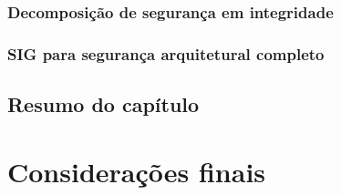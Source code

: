 \subsection{Decomposição de segurança em integridade}

\subsection{SIG para segurança arquitetural completo}

\section{Resumo do capítulo}

\chapter{Considerações finais}
\label{chap:consideracoesFinais}